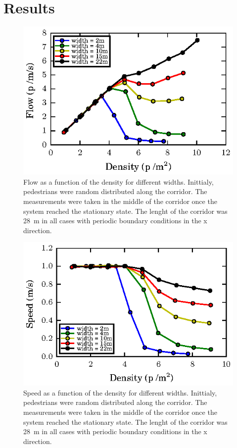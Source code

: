 \section{\label{results}Results}



\begin{figure}
\includegraphics[width=\columnwidth]
{plots/flow-density_vd1_multiple_widths.eps}
\caption{\label{fig:1} Flow as a function of the density for different widths. Inittialy, 
pedestrians were random distributed along the corridor. The measurements were taken in the middle
of the corridor once the system reached the stationary state. The lenght of the corridor 
was 28~m in all cases with periodic boundary conditions in the x direction.}
\end{figure}


\begin{figure}
\includegraphics[width=\columnwidth]
{plots/speed-density_vd1_multiple_widths.eps}
\caption{\label{fig:2} Speed as a function of the density for different widths. Inittialy, 
pedestrians were random distributed along the corridor. The measurements were taken in the middle
of the corridor once the system reached the stationary state. The lenght of the corridor 
was 28~m in all cases with periodic boundary conditions in the x direction.}
\end{figure}


